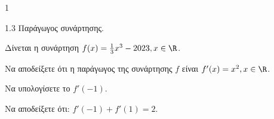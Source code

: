 \begin{ylh}{1}
    \item 1.3 Παράγωγος συνάρτησης.
\end{ylh}
Δίνεται η συνάρτηση $f(x) = \frac{1}{3}x^3 - 2023, x \in \R$.

\begin{alist}
    \item Να αποδείξετε ότι η παράγωγος της συνάρτησης $f$ είναι $f'(x) = x^2, x \in \R$. 
    \item Να υπολογίσετε το $f'(-1)$. 
    \item Να αποδείξετε ότι: $f'(-1) + f'(1) = 2$. 
\end{alist}

